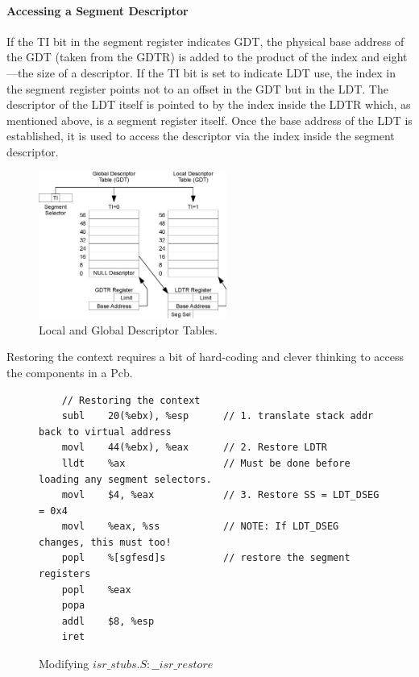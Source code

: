 \documentclass[titlepage]{article}
\begin{document}
\paragraph{Accessing a Segment Descriptor} If the TI bit in the segment register
indicates GDT, the physical base address of the GDT (taken from the GDTR) is
added to the product of the index and eight---the size of a descriptor.  If the
TI bit is set to indicate LDT use, the index in the segment register points not
to an offset in the GDT but in the LDT. The descriptor of the LDT itself is
pointed to by the index inside the LDTR which, as mentioned above, is a segment
register itself. Once the base address of the LDT is established, it is used to
access the descriptor via the index inside the segment descriptor.

\begin{figure}[!ht]
    \centering
    \includegraphics[width=0.55\textwidth]{images/descriptor_tables.eps}
    \caption{Local and Global Descriptor Tables.}
\end{figure}

\newpage
Restoring the context requires a bit of hard-coding and clever thinking to
access the components in a Pcb.

\begin{figure}[!ht]
\begin{verbatim}
    // Restoring the context
    subl    20(%ebx), %esp      // 1. translate stack addr back to virtual address
    movl    44(%ebx), %eax      // 2. Restore LDTR
    lldt    %ax                 // Must be done before loading any segment selectors.
    movl    $4, %eax            // 3. Restore SS = LDT_DSEG = 0x4
    movl    %eax, %ss           // NOTE: If LDT_DSEG changes, this must too!
    popl    %[sgfesd]s          // restore the segment registers
    popl    %eax
    popa
    addl    $8, %esp
    iret
\end{verbatim}
\caption{Modifying $isr\_stubs.S:\_\_isr\_restore$}
\label{isr-restore}
\end{figure}
\end{document}
